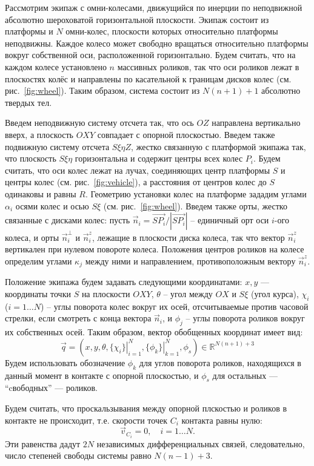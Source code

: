 Рассмотрим экипаж с омни-колесами, движущийся по инерции по неподвижной абсолютно шероховатой горизонтальной плоскости. Экипаж состоит из платформы и $N$ омни-колес, плоскости которых относительно платформы неподвижны. Каждое колесо может свободно вращаться относительно платформы вокруг собственной оси, расположенной горизонтально. Будем считать, что на каждом колесе установлено $n$ массивных роликов, так что оси роликов лежат в плоскостях колёс и направлены по касательной к границам дисков колес (см. рис.~\ref{fig:wheel}). Таким образом, система состоит из $N(n+1) + 1$ абсолютно твердых тел. 

Введем неподвижную систему отсчета так, что ось $OZ$ направлена вертикально вверх, а плоскость $OXY$ совпадает с опорной плоскостью.
Введем также подвижную систему отсчета $S\xi\eta Z$, жестко связанную с платформой экипажа так, что плоскость $S\xi\eta$ горизонтальна и содержит центры всех колес $P_i$. Будем считать, что оси колес лежат на лучах, соединяющих центр платформы $S$ и центры колес (см. рис.~\ref{fig:vehicle}), а расстояния от центров колес до $S$ одинаковы и равны $R$. Геометрию установки колес на платформе зададим углами $\alpha_i$ осями колес и осью $S\xi$
(см. рис.~\ref{fig:wheel}). Введем также орты, жестко связанные с дисками колес: пусть $\vec{n}_i = \vec{SP_i}/|\vec{SP_i}|$ -- единичный орт оси $i$-ого колеса, и орты $\vec{n}_i^\perp$ и $\vec{n}_i^z$, лежащие в плоскости диска колеса, так что вектор $\vec{n}_i^z$ вертикален при нулевом повороте колеса. Положения центров роликов на колесе определим углами $\kappa_j$ между ними и направлением, противоположным вектору $\vec{n}_i^z$. 

Положение экипажа будем задавать следующими координатами:
$x, y$ --- координаты точки $S$ на плоскости $OXY$, $\theta$ -- угол между $OX$ и $S\xi$ (угол курса),
$\chi_i$ ($i = 1\dots N$) -- углы поворота колес вокруг их осей, отсчитываемые против часовой стрелки, если смотреть с конца вектора $\vec{n}_i$, и $\phi_j$ -- углы поворота роликов вокруг их собственных осей.
Таким образом, вектор обобщенных координат имеет вид:
$$\vec{q} = (x, y, \theta, \left.\{\chi_i\}\right|_{i=1}^N , \left.\{\phi_k\}\right|_{k=1}^N, \phi_s)\in\mathbb{R}^{N(n+1) + 3}$$ 
Будем использовать обозначение $\phi_k$ для углов поворота роликов, находящихся в данный момент в контакте с опорной плоскостью, и $\phi_s$ для остальных --- ``cвободных'' --- роликов.

Будем считать, что проскальзывания между опорной плскостью и роликов в контакте не происходит, т.е.
скорости точек $C_i$ контакта равны нулю:
$$\vec{v}_{C_i} = 0,\quad i = 1\dots N.$$
Эти равенства дадут $2N$ независимых дифференциальных связей, следовательно, число степеней свободы системы равно $N(n-1) +3$.

